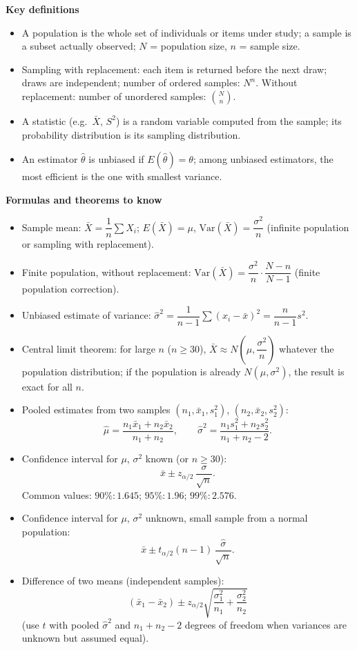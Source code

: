 \documentclass[11pt]{article}
\newcommand{\cle}[1]{{\popxbold\color{popdark}#1}}
\begin{document}
\begin{bilan}
\textbf{Key definitions}
\begin{itemize}
\item A \cle{population} is the whole set of individuals or items under study; a \cle{sample} is a subset actually observed; $N$ = population size, $n$ = sample size.
\item \cle{Sampling with replacement}: each item is returned before the next draw; draws are independent; number of ordered samples: $N^n$. \cle{Without replacement}: number of unordered samples: $\binom{N}{n}$.
\item A \cle{statistic} (e.g.\ $\bar X$, $S^2$) is a random variable computed from the sample; its probability distribution is its \cle{sampling distribution}.
\item An \cle{estimator} $\hat\theta$ is \cle{unbiased} if $E(\hat\theta)=\theta$; among unbiased estimators, the \cle{most efficient} is the one with smallest variance.
\end{itemize}

\textbf{Formulas and theorems to know}
\begin{itemize}
\item Sample mean: $\bar X=\dfrac{1}{n}\sum X_i$; \quad $E(\bar X)=\mu$, \quad $\mathrm{Var}(\bar X)=\dfrac{\sigma^2}{n}$ (infinite population or sampling with replacement).
\item Finite population, without replacement: $\mathrm{Var}(\bar X)=\dfrac{\sigma^2}{n}\cdot\dfrac{N-n}{N-1}$ (finite population correction).
\item Unbiased estimate of variance: $\hat\sigma^2=\dfrac{1}{n-1}\sum (x_i-\bar x)^2=\dfrac{n}{n-1}s^2$.
\item \cle{Central limit theorem}: for large $n$ ($n\ge 30$), $\bar X\approx N\!\left(\mu,\dfrac{\sigma^2}{n}\right)$ whatever the population distribution; if the population is already $N(\mu,\sigma^2)$, the result is exact for all $n$.
\item Pooled estimates from two samples $(n_1,\bar x_1,s_1^2)$, $(n_2,\bar x_2,s_2^2)$:
\[ \hat\mu=\frac{n_1\bar x_1+n_2\bar x_2}{n_1+n_2},\qquad \hat\sigma^2=\frac{n_1s_1^2+n_2s_2^2}{n_1+n_2-2}. \]
\item Confidence interval for $\mu$, $\sigma^2$ known (or $n\ge 30$):
\[ \bar x\pm z_{\alpha/2}\,\frac{\sigma}{\sqrt{n}}. \]
Common values: $90\%\!:1.645$; $95\%\!:1.96$; $99\%\!:2.576$.
\item Confidence interval for $\mu$, $\sigma^2$ unknown, small sample from a normal population:
\[ \bar x\pm t_{\alpha/2}(n-1)\,\frac{\hat\sigma}{\sqrt{n}}. \]
\item Difference of two means (independent samples):
\[ (\bar x_1-\bar x_2)\pm z_{\alpha/2}\sqrt{\frac{\sigma_1^2}{n_1}+\frac{\sigma_2^2}{n_2}} \]
(use $t$ with pooled $\hat\sigma^2$ and $n_1+n_2-2$ degrees of freedom when variances are unknown but assumed equal).
\end{itemize}


\end{bilan}
\end{document}
